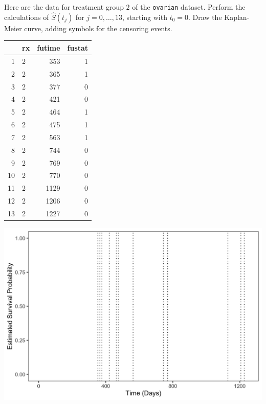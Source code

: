 \begin{question}{}
Here are the data for treatment group $2$ of the \texttt{ovarian} dataset. Perform the calculations of $\hat{S}(t_j)$ for $j = 0, \dots, 13$, starting with $t_0 = 0$. Draw the Kaplan-Meier curve, adding symbols for the censoring events.
{\small
\begin{center}
\begin{tabular}{rlrr}
  \toprule
 & rx & futime & fustat \\ 
  \midrule
  1 & 2 & 353 & 1 \\ 
  2 & 2 & 365 & 1 \\ 
  3 & 2 & 377 & 0 \\ 
  4 & 2 & 421 & 0 \\ 
  5 & 2 & 464 & 1 \\ 
  6 & 2 & 475 & 1 \\ 
  7 & 2 & 563 & 1 \\ 
  8 & 2 & 744 & 0 \\ 
  9 & 2 & 769 & 0 \\ 
  10 & 2 & 770 & 0 \\ 
  11 & 2 & 1129 & 0 \\ 
  12 & 2 & 1206 & 0 \\ 
  13 & 2 & 1227 & 0 \\ 
  \bottomrule
\end{tabular}
\end{center}
}
\begin{center}
\includegraphics[width=\textwidth]{img/km-curve-sample-rx2.png}
\end{center}
\end{question}

